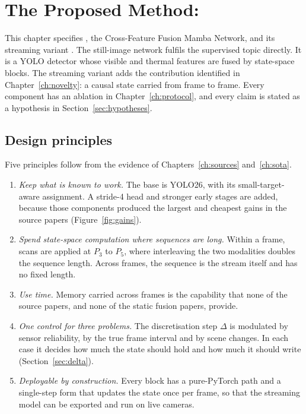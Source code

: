 \chapter{The Proposed Method: \method}
\label{ch:method}

This chapter specifies \method{}, the Cross-Feature Fusion Mamba Network, and
its streaming variant \methodS{}. The still-image network fulfils the
supervised topic directly. It is a YOLO detector whose visible and thermal
features are fused by state-space blocks. The streaming variant adds the
contribution identified in Chapter~\ref{ch:novelty}: a causal state carried
from frame to frame. Every component has an ablation in
Chapter~\ref{ch:protocol}, and every claim is stated as a hypothesis in
Section~\ref{sec:hypotheses}.

\section{Design principles}
\label{sec:principles}

Five principles follow from the evidence of Chapters~\ref{ch:sources}
and~\ref{ch:sota}.

\begin{enumerate}[label=\textsc{p}\arabic*., leftmargin=2.6em]
  \item \emph{Keep what is known to work.} The base is YOLO26, with its
        small-target-aware assignment. A stride-4 head and stronger early
        stages are added, because those components produced the largest and
        cheapest gains in the source papers (Figure~\ref{fig:gains}).
  \item \emph{Spend state-space computation where sequences are long.} Within
        a frame, scans are applied at $P_3$ to $P_5$, where interleaving the
        two modalities doubles the sequence length. Across frames, the
        sequence is the stream itself and has no fixed length.
  \item \emph{Use time.} Memory carried across frames is the capability that
        none of the source papers, and none of the static fusion papers,
        provide.
  \item \emph{One control for three problems.} The discretisation step
        $\Delta$ is modulated by sensor reliability, by the true frame
        interval and by scene changes. In each case it decides how much the
        state should hold and how much it should write
        (Section~\ref{sec:delta}).
  \item \emph{Deployable by construction.} Every block has a pure-PyTorch
        path and a single-step form that updates the state once per frame,
        so that the streaming model can be exported and run on live
        cameras.
\end{enumerate}

